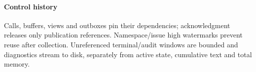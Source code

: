 \paragraph{Control history}
Calls, buffers, views and outboxes pin their dependencies; acknowledgment
releases only publication references. Namespace/issue high watermarks
prevent reuse after collection. Unreferenced terminal/audit windows are
bounded and diagnostics stream to disk, separately from active state,
cumulative text and total memory.
